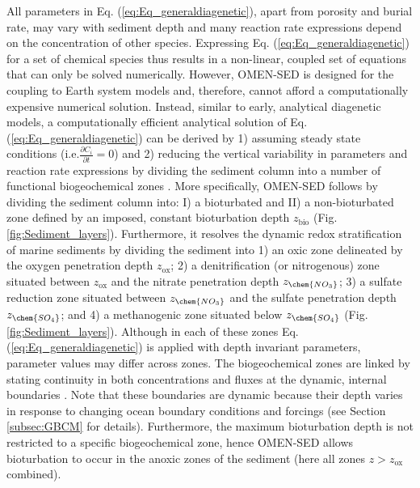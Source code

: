 \documentclass[gmd, manuscript]{copernicus}
\begin{document}
All parameters in Eq. (\ref{eq:Eq_generaldiagenetic}), apart from porosity and burial rate, may vary with sediment depth and many reaction rate expressions depend on the concentration of other species. 
Expressing Eq. (\ref{eq:Eq_generaldiagenetic}) for a set of chemical species thus results in a non-linear, coupled set of equations that can only 
be solved numerically. 
However, OMEN-SED is designed for the coupling to Earth system models and, therefore, cannot afford a computationally expensive numerical solution. 
Instead, similar to early, analytical diagenetic models, a computationally efficient analytical solution of Eq. (\ref{eq:Eq_generaldiagenetic}) can be derived by 1) assuming steady state conditions (i.e.$ \frac{\partial C_i}{\partial t}=0$) 
and 2) reducing the vertical variability in parameters and reaction rate expressions by dividing the sediment column into a number of functional 
biogeochemical zones \citep[Fig. \ref{fig:Sediment_layers}, compare e.g. ][for similar solutions]{billen1982idealized, goloway_diagenetic_1982, ruardij_benthic_1995, tromp_global_1995, gypens_simple_2008}. 
More specifically, OMEN-SED follows \citet{berner_early_1980} by dividing the sediment column into: I) a bioturbated and 
II) a non-bioturbated zone defined by an imposed, constant bioturbation depth $z_{\mathrm{bio}}$ (Fig. \ref{fig:Sediment_layers}). Furthermore, it resolves the dynamic redox stratification of marine sediments by dividing 
the sediment into 1) an oxic zone delineated by the oxygen penetration depth $z_{\mathrm{ox}}$; 2) a denitrification (or nitrogenous) zone situated between $z_{\mathrm{ox}}$ and the nitrate penetration depth $z_{\chem{NO_3}}$;
3) a sulfate reduction zone situated between $z_{\chem{NO_3}}$ and the sulfate penetration depth $z_{\chem{SO_4}}$; and 4) a methanogenic zone situated below $z_{\chem{SO_4}}$ (Fig. \ref{fig:Sediment_layers}).  
Although in each of these zones Eq. (\ref{eq:Eq_generaldiagenetic}) is applied with depth invariant parameters, parameter values may differ across zones. 
The biogeochemical zones are linked by stating continuity in both concentrations and fluxes at the dynamic, internal boundaries 
\citep[$z_b \in \{z_{\mathrm{bio}}, z_{\mathrm{ox}}, z_{\chem{NO_3}}, z_{\chem{SO_4}} \}$, compare e.g.][]{billen1982idealized, ruardij_benthic_1995}. Note that these boundaries are dynamic because their depth varies in response to changing ocean 
boundary conditions and forcings (see Section \ref{subsec:GBCM} for details). Furthermore, the maximum bioturbation depth is not restricted to a specific biogeochemical zone, 
hence OMEN-SED allows bioturbation to occur in the anoxic zones of the sediment (here all zones $z > z_{\mathrm{ox}}$ combined). 
\end{document}

